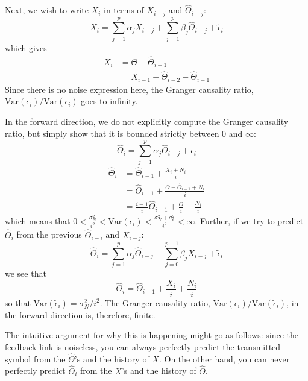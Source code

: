 \documentclass[conference]{IEEEtran}
\begin{document}
Next, we wish to write $X_i$ in terms of $X_{i-j}$ and $\widehat\Theta_{i-j}$:
\begin{equation*}
	X_i = \sum_{j=1}^{p}{\alpha_j X_{i-j}} + \sum_{j=1}^{p}{\beta_j \widehat\Theta_{i-j}} + \tilde\epsilon_i
\end{equation*}
which gives
\begin{align*}
	X_i &= \Theta - \widehat\Theta_{i-1} \\
		&= X_{i-1} + \widehat\Theta_{i-2} - \widehat\Theta_{i-1}
\end{align*}
Since there is no noise expression here, the Granger causality ratio, $\text{Var}(\epsilon_i) / \text{Var}(\tilde\epsilon_i)$ goes to infinity.

In the forward direction, we do not explicitly compute the Granger causality ratio, but simply show that it is bounded strictly between 0 and $\infty$:
\begin{equation*}
	\widehat\Theta_i = \sum_{j=1}^p{\alpha_j \widehat\Theta_{i-j}} + \epsilon_i
\end{equation*}
\begin{align*}
	\widehat\Theta_i &= \widehat\Theta_{i-1} + \frac{X_i + N_i}{i} \\
					 &= \widehat\Theta_{i-1} + \frac{\Theta - \widehat\Theta_{i-1} + N_i}{i} \\
					 &= \frac{i-1}{i} \widehat\Theta_{i-1} + \frac{\Theta}{i} + \frac{N_i}{i}
\end{align*}
which means that $0 < \frac{\sigma_N^2}{i^2} < \text{Var}(\epsilon_i) < \frac{\sigma_N^2 + \sigma_\theta^2}{i^2} < \infty$.
Further, if we try to predict $\widehat\Theta_i$ from the previous $\widehat\Theta_{i-i}$ and $X_{i-j}$:
\begin{equation*}
	\widehat\Theta_i = \sum_{j=1}^{p}{\alpha_j \widehat\Theta_{i-j}} + \sum_{j=0}^{p-1}{\beta_j X_{i-j}} + \tilde\epsilon_i
\end{equation*}
we see that
\begin{equation*}
	\widehat\Theta_i = \widehat\Theta_{i-1} + \frac{X_i}{i} + \frac{N_i}{i}
\end{equation*}
so that $\text{Var}(\tilde\epsilon_i) = \sigma_N^2/i^2$. The Granger causality ratio, $\text{Var}(\epsilon_i) / \text{Var}(\tilde\epsilon_i)$, in the forward direction is, therefore, finite.

The intuitive argument for why this is happening might go as follows: since the feedback link is noiseless, you can always perfectly predict the transmitted symbol from the $\widehat\Theta$'s and the history of $X$. On the other hand, you can never perfectly predict $\widehat\Theta_i$ from the $X$'s and the history of $\widehat\Theta$.
\end{document}
